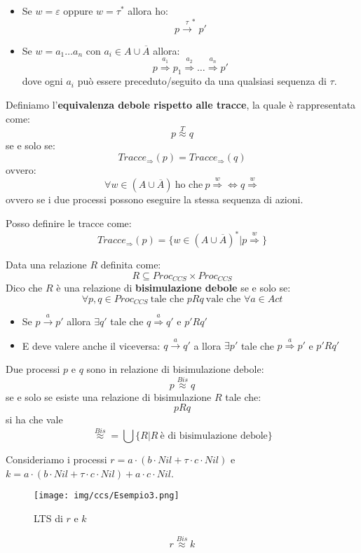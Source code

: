 \begin{itemize}
    \item Se $w = \varepsilon$ oppure $w = \tau^{\ast}$ allora ho: $$p \xrightarrow{\tau}^{\ast} p'$$
    \item Se $w = a_1\dots a_n$ con $a_i \in A \cup \overline{A}$ allora:
          $$p \stackrel{a_1}{\Rightarrow} p_1 \stackrel{a_2}{\Rightarrow} \dots \stackrel{a_n}{\Rightarrow} p'$$
          dove ogni $a_i$ può essere preceduto/seguito da una qualsiasi sequenza di $\tau$.
\end{itemize}
\begin{definizione}
    Definiamo l'\textbf{equivalenza debole rispetto alle tracce}, la quale è
    rappresentata come: $$p \stackrel{T}{\approx} q$$ se e solo se:
    $$Tracce_{\Rightarrow} (p) = Tracce_{\Rightarrow}(q)$$ ovvero:
    $$\forall w \in (A \cup \overline{A}) \ \text{ho che} \ p \stackrel{w}{\Rightarrow} \iff q \stackrel{w}{\Rightarrow}$$
    ovvero se i due processi possono eseguire la stessa sequenza di azioni.
\end{definizione}
Posso definire le tracce come:
$$Tracce_{\Rightarrow}(p) = \{w \in (A \cup \overline{A})^{\ast} | p \stackrel{w}{\Rightarrow}\}$$
\begin{definizione}
    Data una relazione $R$ definita come: $$R \subseteq Proc_{CCS} \times Proc_{CCS}$$
    Dico che $R$ è una relazione di \textbf{bisimulazione debole} se e solo se:
    $$\forall p, q \in Proc_{CCS} \ \text{tale che } p R q \ \text{vale che } \forall a \in Act$$
    \begin{itemize}
        \item Se $p \xrightarrow{a} p'$ allora $\exists q'$ tale che
              $q \stackrel{a}{\Rightarrow} q'$ e $p'Rq'$
        \item E deve valere anche il viceversa: $q \xrightarrow{a} q'$ a
              llora $\exists p'$ tale che $p \stackrel{a}{\Rightarrow} p'$ e $p'Rq'$
    \end{itemize}
\end{definizione}
Due processi $p$ e $q$ sono in relazione di bisimulazione debole:
$$p \stackrel{Bis}{\approx} q$$ se e solo se esiste una relazione di bisimulazione
$R$ tale che: $$p R q$$ si ha che vale $$\stackrel{Bis}{\approx} = \bigcup \{R | R \ \text{è di bisimulazione debole}\}$$
\begin{esempio}
    Consideriamo i processi $r = a \cdot (b \cdot Nil + \tau \cdot c \cdot Nil)$
    e $k = a \cdot (b \cdot Nil + \tau \cdot c \cdot Nil) + a \cdot c \cdot Nil$.
    \begin{figure}[!ht]
        \centering
        \texttt{[image: img/ccs/Esempio3.png]}
        \caption{LTS di $r$ e $k$}
    \end{figure}
    $$r \stackrel{Bis}{\approx} k$$
\end{esempio}
\newpage
